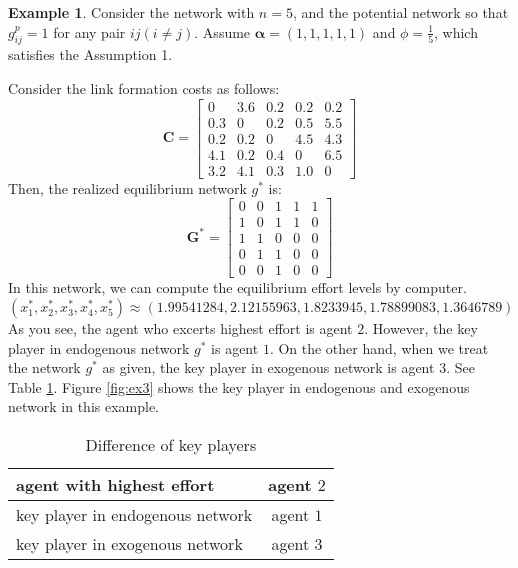 \documentclass[12pt]{article}
\theoremstyle{definition}
\newtheorem{example}{Example}
\newcommand{\bm}[1]{\boldsymbol{#1}}
\begin{document}
\begin{example}
Consider the network with $n=5$, and the potential network so that $g_{ij}^p = 1$ for any pair $ij(i \neq j)$.
Assume $\bm{\alpha} = (1, 1, 1, 1, 1)$ and $\phi = \frac{1}{5}$, which satisfies the Assumption 1.

Consider the link formation costs as follows:
\[\bm{C} = \left[
			\begin{array}{ccccc}
				0 & 3.6 & 0.2 & 0.2 & 0.2 \\
				0.3 & 0 & 0.2 & 0.5 & 5.5 \\
				0.2 & 0.2 & 0 & 4.5 & 4.3 \\
				4.1 & 0.2 & 0.4 & 0 & 6.5 \\
				3.2 & 4.1 & 0.3 & 1.0 & 0
			\end{array} \right] \]
Then, the realized equilibrium network $g^*$ is:
\[\bm{G}^* = \left[
			\begin{array}{ccccc}
				0 & 0 & 1 & 1 & 1 \\
				1 & 0 & 1 & 1 & 0 \\
				1 & 1 & 0 & 0 & 0 \\
				0 & 1 & 1 & 0 & 0 \\
				0 & 0 & 1 & 0 & 0
			\end{array} \right] \]
In this network, we can compute the equilibrium effort levels by computer.
\[ (x_1^*, x_2^*, x_3^*, x_4^*, x_5^*) \approx (1.99541284, 2.12155963, 1.8233945, 1.78899083, 1.3646789) \]
As you see, the agent who excerts highest effort is agent $2$.
However, the key player in endogenous network $g^*$ is agent $1$.
On the other hand, when we treat the network $g^*$ as given, the key player in exogenous network is agent $3$.
See Table \ref{tab:key player}.
Figure \ref{fig:ex3} shows the key player in endogenous and exogenous network in this example.

\begin{table}[htb]
  \begin{center}
    \begin{tabular}{|l|c|} \hline
      agent with highest effort & agent $2$ \\ \hline
      key player in endogenous network & agent $1$ \\ \hline
      key player in exogenous network & agent $3$ \\ \hline
    \end{tabular}
    \caption{Difference of key players}
    \label{tab:key player}
  \end{center}
\end{table}
\end{example}
\end{document}
